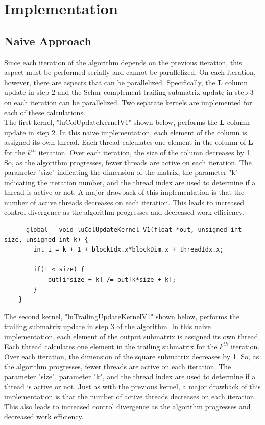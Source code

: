\documentclass{article}
\begin{document}
\section{Implementation}

\subsection{Naive Approach}
Since each iteration of the algorithm depends on the previous iteration, this aspect must be performed serially and cannot be parallelized. On each iteration, however, there are aspects that can be parallelized. Specifically, the $\mathbf{L}$ column update in step 2 and the Schur complement trailing submatrix update in step 3 on each iteration can be parallelized. Two separate kernels are implemented for each of these calculations.\\

The first kernel, "luColUpdateKernel\textunderscore V1" shown below, performs the $\mathbf{L}$ column update in step 2. In this naive implementation, each element of the column is assigned its own thread. Each thread calculates one element in the column of $\mathbf{L}$ for the $k^{th}$ iteration. Over each iteration, the size of the column decreases by 1. So, as the algorithm progresses, fewer threads are active on each iteration. The parameter "size" indicating the dimension of the matrix, the parameter "k" indicating the iteration number, and the thread index are used to determine if a thread is active or not. A major drawback of this implementation is that the number of active threads decreases on each iteration. This leads to increased control divergence as the algorithm progresses and decreased work efficiency.

\begin{verbatim}
	__global__ void luColUpdateKernel_V1(float *out, unsigned int size, unsigned int k) {
		int i = k + 1 + blockIdx.x*blockDim.x + threadIdx.x;
		
		if(i < size) {
			out[i*size + k] /= out[k*size + k];
		}
	}
\end{verbatim}

The second kernel, "luTrailingUpdateKernel\textunderscore V1" shown below, performs the trailing submatrix update in step 3 of the algorithm. In this naive implementation, each element of the output submatrix is assigned its own thread. Each thread calculates one element in the trailing submatrix for the $k^{th}$ iteration. Over each iteration, the dimension of the square submatrix decreases by 1. So, as the algorithm progresses, fewer threads are active on each iteration. The parameter "size", parameter "k", and the thread index are used to determine if a thread is active or not. Just as with the previous kernel, a major drawback of this implementation is that the number of active threads decreases on each iteration. This also leads to increased control divergence as the algorithm progresses and decreased work efficiency.
\end{document}
